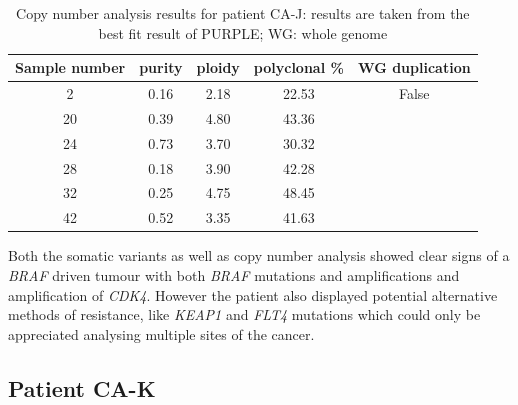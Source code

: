 \begin{table}[ht]
\caption[Copy number analysis results for patient CA-J]{Copy number analysis results for patient CA-J: results are taken from the best fit result of PURPLE; WG: whole genome}\label{tab:ca80cnv}
\centering
{}
\begin{tabular}{|c|c|c|c|c|}
\toprule
\hline
 \rowcolor{gray!50}
\textbf{Sample number} & \textbf{purity} & \textbf{ploidy} & \textbf{polyclonal \%} & \textbf{WG duplication}\\
\hline
 2  & \num{0.16} & \num{2.18} & \num{22.53} & False	\\
 20 & \num{0.39} & \num{4.80} & \num{43.36} & \cellcolor{gray!15} \\
 24 & \num{0.73} & \num{3.70} & \num{30.32} & \cellcolor{gray!15} \\
 28 & \num{0.18} & \num{3.90} & \num{42.28} & \cellcolor{gray!15} \\
 32 & \num{0.25} & \num{4.75} & \num{48.45} & \cellcolor{gray!15} \\
 42 & \num{0.52} & \num{3.35} & \num{41.63} & \cellcolor{gray!15}\multirow{-5}{*}{True} \\
 \hline
\bottomrule
\end{tabular}
\end{table} 


Both the somatic variants as well as copy number analysis showed clear signs of a \textit{BRAF} driven tumour with both \textit{BRAF} mutations and amplifications and amplification of \textit{CDK4}. However the patient also displayed potential alternative methods of resistance, like \textit{KEAP1} and \textit{FLT4} mutations which could only be appreciated analysing multiple sites of the cancer. 



\cleardoublepage



\subsection{Patient CA-K}
\label{cascade-sec:CA82}

